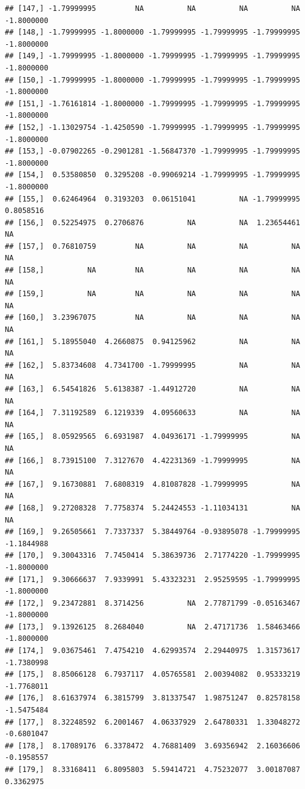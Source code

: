 \documentclass{article}\usepackage[]{graphicx}\usepackage[]{color}
\makeatletter
\newenvironment{kframe}{%
 \def\at@end@of@kframe{}%
 \ifinner\ifhmode%
  \def\at@end@of@kframe{\end{minipage}}%
  \begin{minipage}{\columnwidth}%
 \fi\fi%
 \def\FrameCommand##1{\hskip\@totalleftmargin \hskip-\fboxsep
 \colorbox{shadecolor}{##1}\hskip-\fboxsep
     \hskip-\linewidth \hskip-\@totalleftmargin \hskip\columnwidth}%
 \MakeFramed {\advance\hsize-\width
   \@totalleftmargin\z@ \linewidth\hsize
   \@setminipage}}%
 {\par\unskip\endMakeFramed%
 \at@end@of@kframe}
\newenvironment{knitrout}{}{} %
\makeatother
\begin{document}
\begin{knitrout}
\begin{kframe}
\begin{verbatim}
## [147,] -1.79999995         NA          NA          NA          NA -1.8000000
## [148,] -1.79999995 -1.8000000 -1.79999995 -1.79999995 -1.79999995 -1.8000000
## [149,] -1.79999995 -1.8000000 -1.79999995 -1.79999995 -1.79999995 -1.8000000
## [150,] -1.79999995 -1.8000000 -1.79999995 -1.79999995 -1.79999995 -1.8000000
## [151,] -1.76161814 -1.8000000 -1.79999995 -1.79999995 -1.79999995 -1.8000000
## [152,] -1.13029754 -1.4250590 -1.79999995 -1.79999995 -1.79999995 -1.8000000
## [153,] -0.07902265 -0.2901281 -1.56847370 -1.79999995 -1.79999995 -1.8000000
## [154,]  0.53580850  0.3295208 -0.99069214 -1.79999995 -1.79999995 -1.8000000
## [155,]  0.62464964  0.3193203  0.06151041          NA -1.79999995  0.8058516
## [156,]  0.52254975  0.2706876          NA          NA  1.23654461         NA
## [157,]  0.76810759         NA          NA          NA          NA         NA
## [158,]          NA         NA          NA          NA          NA         NA
## [159,]          NA         NA          NA          NA          NA         NA
## [160,]  3.23967075         NA          NA          NA          NA         NA
## [161,]  5.18955040  4.2660875  0.94125962          NA          NA         NA
## [162,]  5.83734608  4.7341700 -1.79999995          NA          NA         NA
## [163,]  6.54541826  5.6138387 -1.44912720          NA          NA         NA
## [164,]  7.31192589  6.1219339  4.09560633          NA          NA         NA
## [165,]  8.05929565  6.6931987  4.04936171 -1.79999995          NA         NA
## [166,]  8.73915100  7.3127670  4.42231369 -1.79999995          NA         NA
## [167,]  9.16730881  7.6808319  4.81087828 -1.79999995          NA         NA
## [168,]  9.27208328  7.7758374  5.24424553 -1.11034131          NA         NA
## [169,]  9.26505661  7.7337337  5.38449764 -0.93895078 -1.79999995 -1.1844988
## [170,]  9.30043316  7.7450414  5.38639736  2.71774220 -1.79999995 -1.8000000
## [171,]  9.30666637  7.9339991  5.43323231  2.95259595 -1.79999995 -1.8000000
## [172,]  9.23472881  8.3714256          NA  2.77871799 -0.05163467 -1.8000000
## [173,]  9.13926125  8.2684040          NA  2.47171736  1.58463466 -1.8000000
## [174,]  9.03675461  7.4754210  4.62993574  2.29440975  1.31573617 -1.7380998
## [175,]  8.85066128  6.7937117  4.05765581  2.00394082  0.95333219 -1.7768011
## [176,]  8.61637974  6.3815799  3.81337547  1.98751247  0.82578158 -1.5475484
## [177,]  8.32248592  6.2001467  4.06337929  2.64780331  1.33048272 -0.6801047
## [178,]  8.17089176  6.3378472  4.76881409  3.69356942  2.16036606 -0.1958557
## [179,]  8.33168411  6.8095803  5.59414721  4.75232077  3.00187087  0.3362975

\end{verbatim}
\end{kframe}
\end{knitrout}
\end{document}
